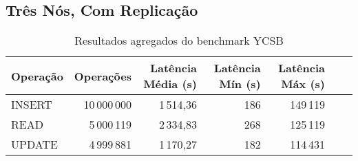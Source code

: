 \subsection{Três Nós, Com Replicação}

	\begin{table}[H]
	\centering
	\caption{Resultados agregados do benchmark YCSB}
	\begin{tabular}{lrrrrrr}
	\hline
	Operação & Operações & Latência Média (\textmu s) & Latência Mín (\textmu s) & Latência Máx (\textmu s) \\
	\hline
	INSERT   & 10\,000\,000 & 1\,514,36 & 186 & 149\,119  \\
	READ     & 5\,000\,119  & 2\,334,83 & 268 & 125\,119  \\
	UPDATE   & 4\,999\,881  & 1\,170,27 & 182 & 114\,431  \\
	\hline
	\end{tabular}
	\end{table}